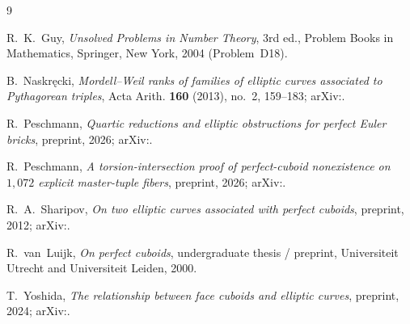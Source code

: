 \documentclass[11pt,reqno]{amsart}
\theoremstyle{plain}
\theoremstyle{definition}
\theoremstyle{remark}
\begin{document}
\begin{thebibliography}{9}

R.~K.~Guy,
\emph{Unsolved Problems in Number Theory}, 3rd ed.,
Problem Books in Mathematics, Springer, New York, 2004 (Problem~D18).

B.~Naskr\k{e}cki,
\emph{Mordell--Weil ranks of families of elliptic curves associated to
Pythagorean triples},
Acta Arith. \textbf{160} (2013), no.~2, 159--183;
arXiv:.

R.~Peschmann,
\emph{Quartic reductions and elliptic obstructions for perfect Euler bricks},
preprint, 2026; arXiv:.

R.~Peschmann,
\emph{A torsion-intersection proof of perfect-cuboid nonexistence on $1{,}072$
explicit master-tuple fibers},
preprint, 2026; arXiv:.

R.~A.~Sharipov,
\emph{On two elliptic curves associated with perfect cuboids},
preprint, 2012; arXiv:.

R.~van~Luijk,
\emph{On perfect cuboids},
undergraduate thesis / preprint, Universiteit Utrecht and Universiteit Leiden,
2000.

T.~Yoshida,
\emph{The relationship between face cuboids and elliptic curves},
preprint, 2024; arXiv:.

\end{thebibliography}
\end{document}
